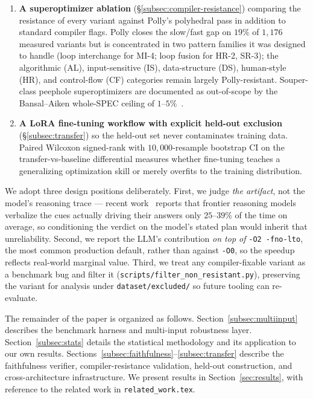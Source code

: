 \begin{enumerate}
\item \textbf{A superoptimizer ablation} (\S\ref{subsec:compiler-resistance}) comparing the resistance of every variant against Polly's polyhedral pass in addition to standard compiler flags. Polly closes the slow/fast gap on $19\%$ of $1{,}176$ measured variants but is concentrated in two pattern families it was designed to handle (loop interchange for MI-4; loop fusion for HR-2, SR-3); the algorithmic (AL), input-sensitive (IS), data-structure (DS), human-style (HR), and control-flow (CF) categories remain largely Polly-resistant. Souper-class peephole superoptimizers are documented as out-of-scope by the Bansal--Aiken whole-SPEC ceiling of $1$--$5\%$~\cite{bansal2006gso}.
\item \textbf{A LoRA fine-tuning workflow with explicit held-out exclusion} (\S\ref{subsec:transfer}) so the held-out set never contaminates training data. Paired Wilcoxon signed-rank with $10{,}000$-resample bootstrap CI on the transfer-vs-baseline differential measures whether fine-tuning teaches a generalizing optimization skill or merely overfits to the training distribution.
\end{enumerate}

We adopt three design positions deliberately. First, we judge \emph{the artifact}, not the model's reasoning trace --- recent work~\cite{chen2025reasoningmodels, lanham2023measuring, turpin2023language} reports that frontier reasoning models verbalize the cues actually driving their answers only $25$--$39\%$ of the time on average, so conditioning the verdict on the model's stated plan would inherit that unreliability. Second, we report the LLM's contribution \emph{on top of} \texttt{-O2 -fno-lto}, the most common production default, rather than against \texttt{-O0}, so the speedup reflects real-world marginal value. Third, we treat any compiler-fixable variant as a benchmark bug and filter it (\texttt{scripts/filter\_non\_resistant.py}), preserving the variant for analysis under \texttt{dataset/excluded/} so future tooling can re-evaluate.

The remainder of the paper is organized as follows. Section~\ref{subsec:multiinput} describes the benchmark harness and multi-input robustness layer. Section~\ref{subsec:stats} details the statistical methodology and its application to our own results. Sections~\ref{subsec:faithfulness}--\ref{subsec:transfer} describe the faithfulness verifier, compiler-resistance validation, held-out construction, and cross-architecture infrastructure. We present results in Section~\ref{sec:results}, with reference to the related work in \texttt{related\_work.tex}.
